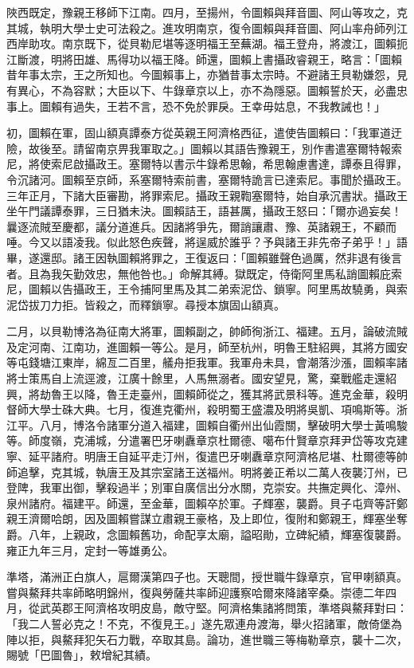 \begin{pinyinscope}
陜西既定，豫親王移師下江南。四月，至揚州，令圖賴與拜音圖、阿山等攻之，克其城，執明大學士史可法殺之。進攻明南京，復令圖賴與拜音圖、阿山率舟師列江西岸助攻。南京既下，從貝勒尼堪等逐明福王至蕪湖。福王登舟，將渡江，圖賴扼江斷渡，明將田雄、馬得功以福王降。師還，圖賴上書攝政睿親王，略言：「圖賴昔年事太宗，王之所知也。今圖賴事上，亦猶昔事太宗時。不避諸王貝勒嫌怨，見有異心，不為容默；大臣以下、牛錄章京以上，亦不為隱惡。圖賴誓於天，必盡忠事上。圖賴有過失，王若不言，恐不免於罪戾。王幸毋姑息，不我教誡也！」

初，圖賴在軍，固山額真譚泰方從英親王阿濟格西征，遣使告圖賴曰：「我軍道迂險，故後至。請留南京畀我軍取之。」圖賴以其語告豫親王，別作書遣塞爾特報索尼，將使索尼啟攝政王。塞爾特以書示牛錄希思翰，希思翰慮書達，譚泰且得罪，令沉諸河。圖賴至京師，系塞爾特索前書，塞爾特詭言已達索尼。事聞於攝政王。三年正月，下諸大臣審勘，將罪索尼。攝政王親鞫塞爾特，始自承沉書狀。攝政王坐午門議譚泰罪，三日猶未決。圖賴詰王，語甚厲，攝政王怒曰：「爾亦過妄矣！曩逐流賊至慶都，議分道進兵。因諸將爭先，爾誚讓肅、豫、英諸親王，不顧而唾。今又以語凌我。似此怒色疾聲，將逞威於誰乎？予與諸王非先帝子弟乎！」語畢，遂還邸。諸王因執圖賴將罪之，王復返曰：「圖賴雖聲色過厲，然非退有後言者。且為我矢勤效忠，無他咎也。」命解其縛。獄既定，侍衛阿里馬私誚圖賴庇索尼，圖賴以告攝政王，王令捕阿里馬及其二弟索泥岱、鎖寧。阿里馬故驍勇，與索泥岱拔刀力拒。皆殺之，而釋鎖寧。尋授本旗固山額真。

二月，以貝勒博洛為征南大將軍，圖賴副之，帥師徇浙江、福建。五月，論破流賊及定河南、江南功，進圖賴一等公。是月，師至杭州，明魯王駐紹興，其將方國安等屯錢塘江東岸，綿亙二百里，艤舟拒我軍。我軍舟未具，會潮落沙漲，圖賴率諸將士策馬自上流逕渡，江廣十餘里，人馬無溺者。國安望見，驚，棄戰艦走還紹興，將劫魯王以降，魯王走臺州，圖賴師從之，獲其將武景科等。進克金華，殺明督師大學士硃大典。七月，復進克衢州，殺明蜀王盛濃及明將吳凱、項鳴斯等。浙江平。八月，博洛令諸軍分道入福建，圖賴自衢州出仙霞關，擊破明大學士黃鳴駿等。師度嶺，克浦城，分遣署巴牙喇纛章京杜爾德、噶布什賢章京拜尹岱等攻克建寧、延平諸府。明唐王自延平走汀州，復遣巴牙喇纛章京阿濟格尼堪、杜爾德等帥師追擊，克其城，執唐王及其宗室諸王送福州。明將姜正希以二萬人夜襲汀州，已登陴，我軍出御，擊殺過半；別軍自廣信出分水關，克崇安。共撫定興化、漳州、泉州諸府。福建平。師還，至金華，圖賴卒於軍。子輝塞，襲爵。貝子屯齊等訐鄭親王濟爾哈朗，因及圖賴嘗謀立肅親王豪格，及上即位，復附和鄭親王，輝塞坐奪爵。八年，上親政，念圖賴舊功，命配享太廟，謚昭勛，立碑紀績，輝塞復襲爵。雍正九年三月，定封一等雄勇公。

準塔，滿洲正白旗人，扈爾漢第四子也。天聰間，授世職牛錄章京，官甲喇額真。嘗與鰲拜共率師略明錦州，復與勞薩共率師迎護察哈爾來降諸宰桑。崇德二年四月，從武英郡王阿濟格攻明皮島，敵守堅。阿濟格集諸將問策，準塔與鰲拜對曰：「我二人誓必克之！不克，不復見王。」遂先眾連舟渡海，舉火招諸軍，敵倚堡為陣以拒，與鰲拜犯矢石力戰，卒取其島。論功，進世職三等梅勒章京，襲十二次，賜號「巴圖魯」，敕增紀其績。


\end{pinyinscope}
